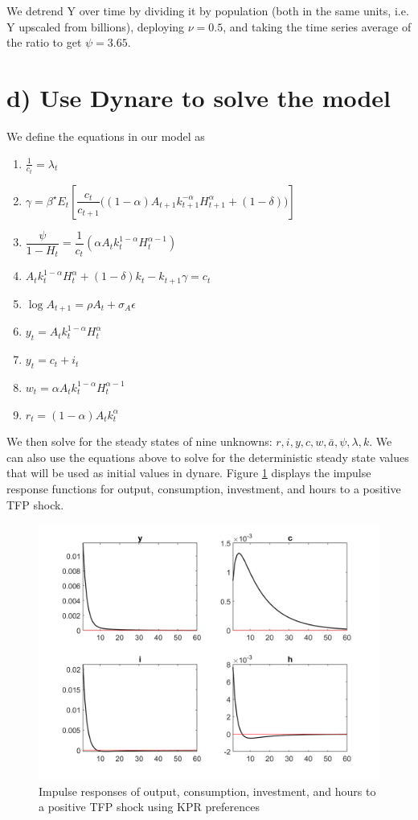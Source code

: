 \documentclass[10pt,letter]{article}
\begin{document}
We detrend Y over time by dividing it by population (both in the same units, i.e. Y upscaled from billions), deploying $\nu = 0.5$, and taking the time series average of the ratio to get $\psi = 3.65$.

\section*{d) Use Dynare to solve the model}
We define the equations in our model as 
\begin{enumerate}
	\item $\frac{1}{c_t} = \lambda_t$
	\item $\gamma = \beta^{\star}E_t\left[\dfrac{c_{t}}{c_{t+1}}\bigg((1-\alpha)A_{t+1} k_{t+1}^{-\alpha}H_{t+1}^{\alpha} + (1-\delta)\bigg)\right]$
	\item $\dfrac{\psi}{1-H_{t}} = \dfrac{1}{c_{t}}\left(\alpha A_{t}k_{t}^{1-\alpha}H_{t}^{\alpha-1}\right)$
	\item $A_{t}k_{t}^{1-\alpha}H_{t}^{\alpha} + (1-\delta)k_{t}-k_{t+1}\gamma = c_{t}$
	\item $\log A_{t+1} = \rho A_{t} + \sigma_{A}\epsilon$
    \item $y_{t} = A_{t}k_{t}^{1-\alpha}H_{t}^{\alpha}$
    \item $y_{t} = c_{t} + i_{t}$
    \item $w_{t} = \alpha A_{t}k_{t}^{1-\alpha}H_{t}^{\alpha-1}$
    \item $r_t = (1-\alpha)A_{t}k_{t}^{\alpha}$
\end{enumerate}  
We then solve for the steady states of nine unknowns: $r, i, y, c, w, \bar{a}, \psi, \lambda, k$. We can also use the equations above to solve for the deterministic steady state values that will be used as initial values in dynare. Figure \ref{fig:KPR_irfs} displays the impulse response functions for output, consumption, investment, and hours to a positive TFP shock. \\

\begin{figure}[H]
	\centering
	\includegraphics[width=1\linewidth]{irfs_yich_kpr.png}
	\caption{Impulse responses of output, consumption, investment, and hours to a positive TFP shock using KPR preferences}
	\label{fig:KPR_irfs}
\end{figure} 
\end{document}

